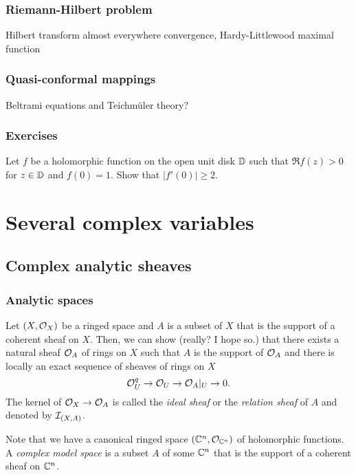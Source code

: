 \documentclass{../../large}
\begin{document}
\section{Riemann-Hilbert problem}
Hilbert transform
almost everywhere convergence, Hardy-Littlewood maximal function

\section{Quasi-conformal mappings}
Beltrami equations and Teichm\"uler theory?

\section{Exercises}
\begin{prb}
Let $f$ be a holomorphic function on the open unit disk $\mathbb{D}$ such that $\Re f(z)>0$ for $z\in\mathbb{D}$ and $f(0)=1$. Show that $|f'(0)|\ge2$.
\end{prb}






\chapter{}






\part{Several complex variables}

\chapter{Complex analytic sheaves}


\section{Analytic spaces}

\begin{prb}

Let $(X,\mathcal{O}_X)$ be a ringed space and $A$ is a subset of $X$ that is the support of a coherent sheaf on $X$.
Then, we can show (really? I hope so.) that there exists a natural sheaf $\mathcal{O}_A$ of rings on $X$ such that $A$ is the support of $\mathcal{O}_A$ and there is locally an exact sequence of sheaves of rings on $X$
\[\mathcal{O}_U^q\to\mathcal{O}_U\to\mathcal{O}_A|_U\to0.\]
The kernel of $\mathcal{O}_X\to\mathcal{O}_A$ is called the \emph{ideal sheaf} or the \emph{relation sheaf} of $A$ and denoted by $\mathcal{I}_{(X,A)}$.

Note that we have a canonical ringed space $(\mathbb{C}^n,\mathcal{O}_{\mathbb{C}^n})$ of holomorphic functions.
A \emph{complex model space} is a subset $A$ of some $\mathbb{C}^n$ that is the support of a coherent sheaf on $\mathbb{C}^n$.
\end{prb}
\begin{pf}

\end{pf}
\end{document}
